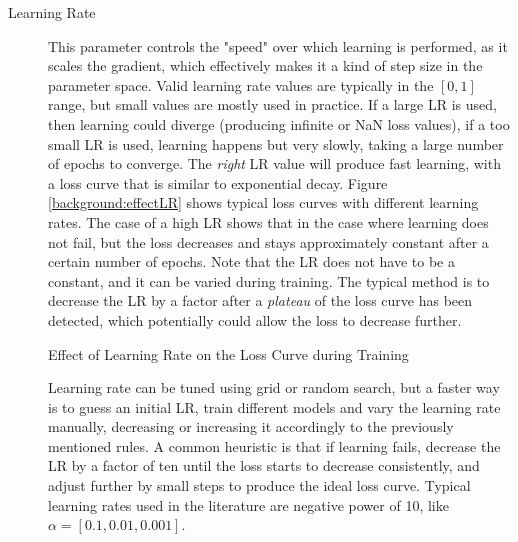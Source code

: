 \begin{description}
    \item[Learning Rate] This parameter controls the "speed" over which learning is performed, as it scales the gradient, which effectively makes it a kind of step size in the parameter space. Valid learning rate values are typically in the $[0, 1]$ range, but small values are mostly used in practice. If a large LR is used, then learning could diverge (producing infinite or NaN loss values), if a too small LR is used, learning happens but very slowly, taking a large number of epochs to converge. The \textit{right} LR value will produce fast learning, with a loss curve that is similar to exponential decay. Figure \ref{background:effectLR} shows typical loss curves with different learning rates. The case of a high LR shows that in the case where learning does not fail, but the loss decreases and stays approximately constant after a certain number of epochs. Note that the LR does not have to be a constant, and it can be varied during training. The typical method is to decrease the LR by a factor after a \textit{plateau} of the loss curve has been detected, which potentially could allow the loss to decrease further.
    
    \begin{marginfigure}
        \caption{Effect of Learning Rate on the Loss Curve during Training}
        \label{background:effectLR}
    \end{marginfigure}
    
    Learning rate can be tuned using grid or random search, but a faster way is to guess an initial LR, train different models and vary the learning rate manually, decreasing or increasing it accordingly to the previously mentioned rules. A common heuristic \cite{Goodfellow2016deep} is that if learning fails, decrease the LR by a factor of ten until the loss starts to decrease consistently, and adjust further by small steps to produce the ideal loss curve. Typical learning rates used in the literature are negative power of 10, like $\alpha = [0.1, 0.01, 0.001]$.
    

\end{description}
